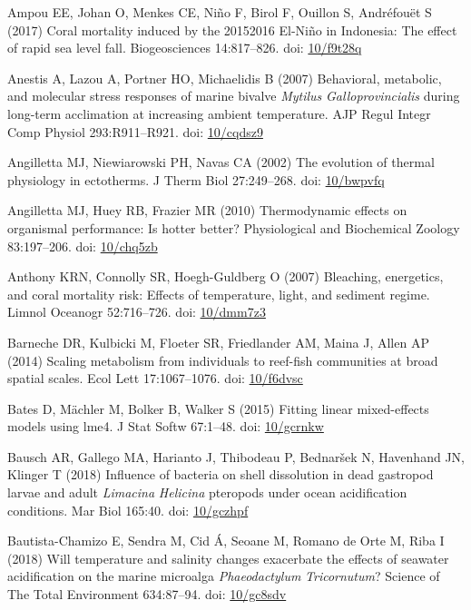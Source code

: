 \documentclass[a4paper,10pt, oneside]{memoir}
\begin{document}
\leavevmode\hypertarget{ref-Ampou2017}{}%
Ampou EE, Johan O, Menkes CE, Niño F, Birol F, Ouillon S, Andréfouët S (2017) Coral mortality induced by the 20152016 El-Niño in Indonesia: The effect of rapid sea level fall. Biogeosciences 14:817--826. doi: \href{https://doi.org/10/f9t28q}{10/f9t28q}

\leavevmode\hypertarget{ref-Anestis2007}{}%
Anestis A, Lazou A, Portner HO, Michaelidis B (2007) Behavioral, metabolic, and molecular stress responses of marine bivalve \emph{Mytilus} \emph{Galloprovincialis} during long-term acclimation at increasing ambient temperature. AJP Regul Integr Comp Physiol 293:R911--R921. doi: \href{https://doi.org/10/cqdsz9}{10/cqdsz9}

\leavevmode\hypertarget{ref-Angilletta2002}{}%
Angilletta MJ, Niewiarowski PH, Navas CA (2002) The evolution of thermal physiology in ectotherms. J Therm Biol 27:249--268. doi: \href{https://doi.org/10/bwpvfq}{10/bwpvfq}

\leavevmode\hypertarget{ref-Angilletta2010}{}%
Angilletta MJ, Huey RB, Frazier MR (2010) Thermodynamic effects on organismal performance: Is hotter better? Physiological and Biochemical Zoology 83:197--206. doi: \href{https://doi.org/10/chq5zb}{10/chq5zb}

\leavevmode\hypertarget{ref-Anthony2007}{}%
Anthony KRN, Connolly SR, Hoegh-Guldberg O (2007) Bleaching, energetics, and coral mortality risk: Effects of temperature, light, and sediment regime. Limnol Oceanogr 52:716--726. doi: \href{https://doi.org/10/dmm7z3}{10/dmm7z3}

\leavevmode\hypertarget{ref-Barneche2014}{}%
Barneche DR, Kulbicki M, Floeter SR, Friedlander AM, Maina J, Allen AP (2014) Scaling metabolism from individuals to reef-fish communities at broad spatial scales. Ecol Lett 17:1067--1076. doi: \href{https://doi.org/10/f6dvsc}{10/f6dvsc}

\leavevmode\hypertarget{ref-Bates2015}{}%
Bates D, Mächler M, Bolker B, Walker S (2015) Fitting linear mixed-effects models using lme4. J Stat Softw 67:1--48. doi: \href{https://doi.org/10/gcrnkw}{10/gcrnkw}

\leavevmode\hypertarget{ref-Bausch2018}{}%
Bausch AR, Gallego MA, Harianto J, Thibodeau P, Bednaršek N, Havenhand JN, Klinger T (2018) Influence of bacteria on shell dissolution in dead gastropod larvae and adult \emph{Limacina} \emph{Helicina} pteropods under ocean acidification conditions. Mar Biol 165:40. doi: \href{https://doi.org/10/gczhpf}{10/gczhpf}

\leavevmode\hypertarget{ref-Bautista-Chamizo2018}{}%
Bautista-Chamizo E, Sendra M, Cid Á, Seoane M, Romano de Orte M, Riba I (2018) Will temperature and salinity changes exacerbate the effects of seawater acidification on the marine microalga \emph{Phaeodactylum} \emph{Tricornutum}? Science of The Total Environment 634:87--94. doi: \href{https://doi.org/10/gc8sdv}{10/gc8sdv}
\end{document}
